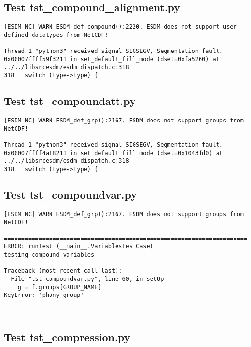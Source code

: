 \subsection{Test tst\_compound\_alignment.py}

\begin{verbatim}
[ESDM NC] WARN ESDM_def_compound():2220. ESDM does not support user-defined datatypes from NetCDF!

Thread 1 "python3" received signal SIGSEGV, Segmentation fault.
0x00007ffff59f3211 in set_default_fill_mode (dset=0xfa5260) at ../../libsrcesdm/esdm_dispatch.c:318
318	  switch (type->type) {
\end{verbatim}

\subsection{Test tst\_compoundatt.py}

\begin{verbatim}
[ESDM NC] WARN ESDM_def_grp():2167. ESDM does not support groups from NetCDF!

Thread 1 "python3" received signal SIGSEGV, Segmentation fault.
0x00007ffff4a18211 in set_default_fill_mode (dset=0x1043fd0) at ../../libsrcesdm/esdm_dispatch.c:318
318	  switch (type->type) {
\end{verbatim}

\subsection{Test tst\_compoundvar.py}

\begin{verbatim}
[ESDM NC] WARN ESDM_def_grp():2167. ESDM does not support groups from NetCDF!

======================================================================
ERROR: runTest (__main__.VariablesTestCase)
testing compound variables
----------------------------------------------------------------------
Traceback (most recent call last):
  File "tst_compoundvar.py", line 60, in setUp
    g = f.groups[GROUP_NAME]
KeyError: 'phony_group'

----------------------------------------------------------------------
\end{verbatim}

\subsection{Test tst\_compression.py}

